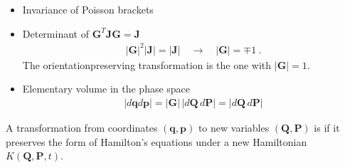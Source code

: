 \documentclass[letterpaper,10pt,english]{jupyterBook}
\begin{document}
\begin{itemize}
\item {} 
\sphinxAtStartPar
Invariance of Poisson brackets

\sphinxAtStartPar
{}

\item {} 
\sphinxAtStartPar
Determinant of \(\mathbf{G}^T \mathbf{J} \mathbf{G} = \mathbf{J}\)
\begin{equation*}
\begin{split}| \mathbf{G} |^2 |\mathbf{J}| = |\mathbf{J}| \quad \rightarrow \quad | \mathbf{G} | = \mp 1 \ .\end{split}
\end{equation*}
\sphinxAtStartPar
The orientation\sphinxhyphen{}preserving transformation is the one with \(| \mathbf{G} | = 1\).

\item {} 
\sphinxAtStartPar
Elementary volume in the phase space
\begin{equation*}
\begin{split}|d \mathbf{q} d \mathbf{p}| = | \mathbf{G}| \, | d \mathbf{Q} \, d \mathbf{P} | = | d \mathbf{Q} \, d \mathbf{P} |\end{split}
\end{equation*}
\end{itemize}

\sphinxAtStartPar
A transformation from coordinates \((\mathbf{q}, \mathbf{p})\) to new variables \((\mathbf{Q}, \mathbf{P})\) is  if it preserves the form of Hamilton’s equations under a new Hamiltonian \(K(\mathbf{Q}, \mathbf{P}, t)\).
\end{document}
